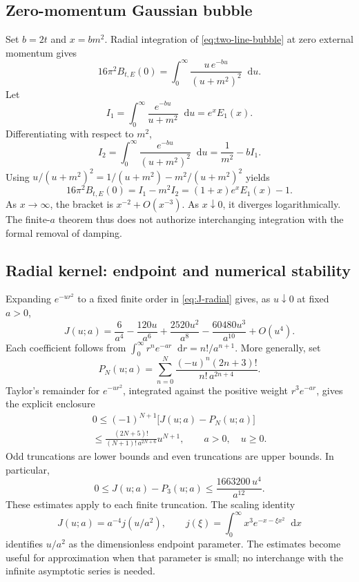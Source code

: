 \documentclass[final,5p,times,twocolumn,numbers,nopreprintline]{elsarticle}
\numberwithin{equation}{section}
\theoremstyle{definition}
\theoremstyle{remark}
\newcommand{\dd}{\mathop{}\!\mathrm d}
\begin{document}
\subsection{Zero-momentum Gaussian bubble}

Set \(b=2t\) and \(x=bm^2\). Radial integration of
\eqref{eq:two-line-bubble} at zero external momentum gives
\[
 16\pi^2B_{t,E}(0)
   =\int_0^\infty
          \frac{u\,e^{-bu}}{(u+m^2)^2}\dd u.
\]
Let
\[
 I_1=\int_0^\infty\frac{e^{-bu}}{u+m^2}\dd u
       =e^xE_1(x).
\]
Differentiating with respect to \(m^2\),
\[
 I_2=\int_0^\infty\frac{e^{-bu}}{(u+m^2)^2}\dd u
       =\frac1{m^2}-bI_1.
\]
Using \(u/(u+m^2)^2=1/(u+m^2)-m^2/(u+m^2)^2\)
yields
\[
 16\pi^2B_{t,E}(0)
   =I_1-m^2I_2=(1+x)e^xE_1(x)-1.
\]
As \(x\to\infty\), the bracket is \(x^{-2}+O(x^{-3})\).
As \(x\downarrow0\), it diverges logarithmically.
The finite-\(a\) theorem thus does not authorize interchanging
integration with the formal removal of damping.

\subsection{Radial kernel: endpoint and numerical stability}

Expanding \(e^{-ur^2}\) to a fixed finite order in
\eqref{eq:J-radial} gives, as \(u\downarrow0\) at fixed
\(a>0\),
\begin{equation}
 J(u;a)
 =\frac6{a^4}-\frac{120u}{a^6}
        +\frac{2520u^2}{a^8}
        -\frac{60480u^3}{a^{10}}+O(u^4).
 \label{eq:J-endpoint-expansion}
\end{equation}
Each coefficient follows from
\(\int_0^\infty r^n e^{-ar}\dd r=n!/a^{n+1}\).
More generally, set
\[
 P_N(u;a)=\sum_{n=0}^N
       \frac{(-u)^n(2n+3)!}{n!\,a^{2n+4}}.
\]
Taylor's remainder for \(e^{-ur^2}\), integrated against the positive
weight \(r^3e^{-ar}\), gives the explicit enclosure
\begin{equation}
\begin{gathered}
 0\leq(-1)^{N+1}\bigl[J(u;a)-P_N(u;a)\bigr]\\
 \leq\frac{(2N+5)!}{(N+1)!\,a^{2N+6}}u^{N+1},
 \qquad a>0,\quad u\geq0.
\end{gathered}
 \label{eq:J-truncation-bound}
\end{equation}
Odd truncations are lower bounds and even truncations are upper
bounds. In particular,
\[
 0\leq J(u;a)-P_3(u;a)
       \leq\frac{1663200\,u^4}{a^{12}}.
\]
These estimates apply to each finite truncation. The scaling identity
\[
 J(u;a)=a^{-4}j(u/a^2),\qquad
 j(\xi)=\int_0^\infty x^3e^{-x-\xi x^2}\dd x
\]
identifies \(u/a^2\) as the dimensionless endpoint parameter.
The estimates become useful for approximation when that parameter is
small; no interchange with the infinite asymptotic series is needed.
\end{document}
